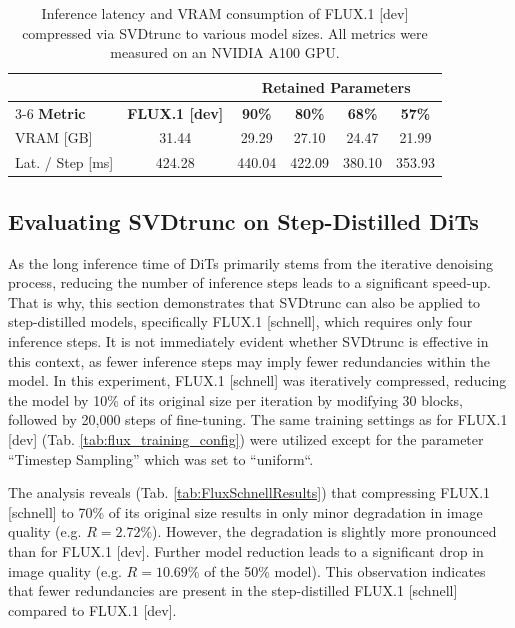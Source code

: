 \begin{table}[H]
	\small
	\centering
	\begin{tabular}{l c c c c c}
		\toprule
		& & \multicolumn{4}{c}{\textbf{Retained Parameters}} \\
		\cmidrule(lr){3-6} %
		\textbf{Metric} & \textbf{FLUX.1 {[dev]}} & \textbf{90\%} & \textbf{80\%} & \textbf{68\%} & \textbf{57\%} \\
		\midrule
		VRAM [GB]        & 31.44  & 29.29  & 27.10  & 24.47  & 21.99  \\
		Lat. / Step [ms] & {424.28} & {440.04} & 422.09 & 380.10 & 353.93 \\
		\bottomrule
	\end{tabular}
			\caption[\gls{VRAM} Consumption and Latency of \gls{SVD}trunc]{Inference latency and \gls{VRAM} consumption of FLUX.1 {[dev]} compressed via \gls{SVD}trunc to various model sizes. All metrics were measured on an NVIDIA A100 GPU.}
		\label{tab:inference_vram_metrics}
\end{table}
\subsection{Evaluating SVDtrunc on Step-Distilled \gls{DiT}s}
\label{sec:FluxSchnellMainResults}


As the long inference time of \gls{DiT}s primarily stems from the iterative denoising process, reducing the number of inference steps leads to a significant speed-up. That is why, this section demonstrates that \gls{SVD}trunc can also be applied to step-distilled models, specifically FLUX.1 {[schnell]}, which requires only four inference steps. It is not immediately evident whether \gls{SVD}trunc is effective in this context, as fewer inference steps may imply fewer redundancies within the model. In this experiment, FLUX.1 {[schnell]} was iteratively compressed, reducing the model by 10\% of its original size per iteration by modifying 30 blocks, followed by 20,000 steps of fine-tuning. The same training settings as for FLUX.1 {[dev]} (Tab. \ref{tab:flux_training_config}) were utilized except for the parameter ``Timestep Sampling'' which was set to ``uniform``.

The analysis reveals (Tab. \ref{tab:FluxSchnellResults}) that compressing FLUX.1 {[schnell]} to 70\% of its original size results in only minor degradation in image quality (e.g. $R=2.72\%$). However, the degradation is slightly more pronounced than for FLUX.1 {[dev]}. Further model reduction leads to a significant drop in image quality (e.g. $R=10.69\%$ of the 50\% model). This observation indicates that fewer redundancies are present in the step-distilled FLUX.1 {[schnell]} compared to FLUX.1 {[dev]}.


